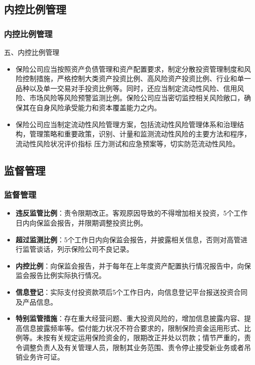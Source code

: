 \documentclass[a4paper,12pt]{ctexbeamer}
\begin{document}
\subsection{内控比例管理}
\begin{frame}
    \frametitle{内控比例管理}
    \begin{block}{五、内控比例管理}
        \begin{itemize}
            \item 保险公司应当按照资产负债管理和资产配置要求，制定分散投资管理制度和风险控制措施，严格控制大类资产投资比例、高风险资产投资比例、行业和单一品种以及单一交易对手投资比例等。同时，还应当制定流动性风险、信用风险、市场风险等风险预警监测比例。保险公司应当密切监控相关风险敞口，确保其在自身风险承受能力和资本覆盖能力之内。
            \item 保险公司应当制定流动性风险管理方案，包括流动性风险管理体系和治理结构，管理策略和重要政策，识别、计量和监测流动性风险的主要方法和程序，流动性风险状况评价指标 压力测试和应急预案等，切实防范流动性风险。
        \end{itemize}
    \end{block}

\end{frame}
\subsection{监督管理}
\begin{frame}
    \frametitle{监督管理}
    \begin{itemize}
        \item \textbf{违反监管比例}：责令限期改正。客观原因导致的不得增加相关投资，5个工作日内向保监会报告，并限期调整投资比例。
        \item \textbf{超过监测比例}：5个工作日内向保监会报告，并披露相关信息，否则对高管进行监管谈话，列示保险公司不良记录。
        \item \textbf{内控比例}：向保监会报告，并于每年在上年度资产配置执行情况报告中，向保监会报告比例实际执行情况。
        \item \textbf{信息登记}：实际支付投资款项后5个工作日内，向信息登记平台报送投资合同及产品信息。

        \item \textbf{特别监管措施}：存在重大经营问题、重大投资风险的，增加信息披露内容、提高信息披露频率等。偿付能力状况不符合要求的，限制保险资金运用形式、比例等。未按有关规定运用保险资金的，限期改正并处以罚款；情节严重的，责令调整负责人及有关管理人员，限制其业务范围、责令停止接受新业务或者吊销业务许可证。
    \end{itemize}
\end{frame}
\end{document}

